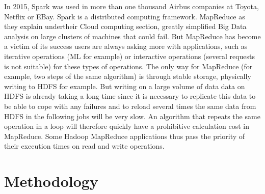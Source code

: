 \documentclass{acmtog} %
\begin{document}
In 2015, Spark was used in more than one thousand Airbus companies at Toyota, Netflix or EBay. Spark is a distributed computing framework. MapReduce \cite{Baltas17} as they explain undertheir Cloud computing section, greatly simplified Big Data \cite{Garg14} analysis on large clusters of machines that could fail. But MapReduce has become a victim of its success users are always asking more with applications, such as iterative operations (ML for example) or interactive operations (several requests is not suitable) for these types of operations. The only way for MapReduce (for example, two steps of the same algorithm) is through stable storage, physically writing to HDFS for example. But writing on a large volume of data data on HDFS is already taking a long time since it is necessary to replicate this data to be able to cope with any failures and to reload several times the same data from HDFS in the following jobs will be very slow. An algorithm that repeats the same operation in a loop will therefore quickly have a prohibitive calculation cost in MapReduce. Some Hadoop MapReduce applications thus pass the priority of their execution times on read and write operations.



\section{Methodology}
\label{sec:methodology}
\end{document}
